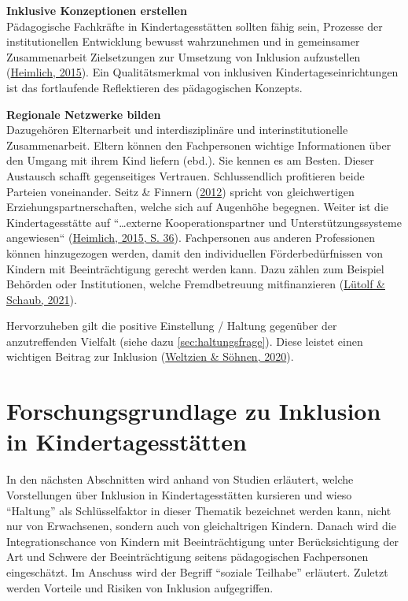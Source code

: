 \documentclass[
  ngerman,
  11pt,
  paper=a4,
  twoside,
  titlepage=true,
  openright,
  abstract=on,
  toc=listofnumbered,
  numbers=noenddot,
  chapterprefix=true,
  headings=optiontohead,
  svgnames,
  dvipsnames]{scrreprt}
\begin{document}
\textbf{Inklusive Konzeptionen erstellen}\\
Pädagogische Fachkräfte in Kindertagesstätten sollten fähig sein,
Prozesse der institutionellen Entwicklung bewusst wahrzunehmen und in
gemeinsamer Zusammenarbeit Zielsetzungen zur Umsetzung von Inklusion
aufzustellen
(\protect\hyperlink{ref-inklusionQualituxe4t_Heimlich}{Heimlich, 2015}).
Ein Qualitätsmerkmal von inklusiven Kindertageseinrichtungen ist das
fortlaufende Reflektieren des pädagogischen Konzepts.

\textbf{Regionale Netzwerke bilden}\\
Dazugehören Elternarbeit und interdisziplinäre und interinstitutionelle
Zusammenarbeit. Eltern können den Fachpersonen wichtige Informationen
über den Umgang mit ihrem Kind liefern (ebd.). Sie kennen es am Besten.
Dieser Austausch schafft gegenseitiges Vertrauen. Schlussendlich
profitieren beide Parteien voneinander. Seitz \& Finnern
(\protect\hyperlink{ref-seitzfinnern}{2012}) spricht von gleichwertigen
Erziehungspartnerschaften, welche sich auf Augenhöhe begegnen. Weiter
ist die Kindertagesstätte auf “…externe Kooperationspartner und
Unterstützungssysteme angewiesen“
(\protect\hyperlink{ref-inklusionQualituxe4t_Heimlich}{Heimlich, 2015,
S. 36}). Fachpersonen aus anderen Professionen können hinzugezogen
werden, damit den individuellen Förderbedürfnissen von Kindern mit
Beeinträchtigung gerecht werden kann. Dazu zählen zum Beispiel Behörden
oder Institutionen, welche Fremdbetreuung mitfinanzieren
(\protect\hyperlink{ref-tiki}{Lütolf \& Schaub, 2021}).

Hervorzuheben gilt die positive Einstellung / Haltung gegenüber der
anzutreffenden Vielfalt (siehe dazu \cref{sec:haltungsfrage}). Diese
leistet einen wichtigen Beitrag zur Inklusion
(\protect\hyperlink{ref-einstellungPuxe4dagogischerFachkruxe4ften_Weltzien}{Weltzien
\& Söhnen, 2020}).

\hypertarget{sec:forschungsgrundlageneu}{%
\section{Forschungsgrundlage zu Inklusion in
Kindertagesstätten}\label{sec:forschungsgrundlageneu}}

In den nächsten Abschnitten wird anhand von Studien erläutert, welche
Vorstellungen über Inklusion in Kindertagesstätten kursieren und wieso
“Haltung” als Schlüsselfaktor in dieser Thematik bezeichnet werden kann,
nicht nur von Erwachsenen, sondern auch von gleichaltrigen Kindern.
Danach wird die Integrationschance von Kindern mit Beeinträchtigung
unter Berücksichtigung der Art und Schwere der Beeinträchtigung seitens
pädagogischen Fachpersonen eingeschätzt. Im Anschuss wird der Begriff
“soziale Teilhabe” erläutert. Zuletzt werden Vorteile und Risiken von
Inklusion aufgegriffen.
\end{document}
